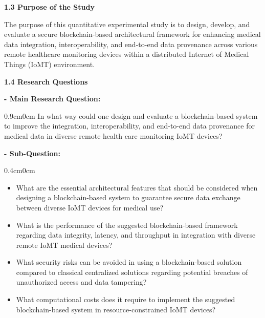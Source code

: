 \documentclass[12pt, a4paper]{report}
\begin{document}
\vspace{0.5cm}
{\color{myblue} \Large \bfseries 1.3 Purpose of the Study}

\noindent The purpose of this quantitative experimental study is to design, develop, and evaluate a secure blockchain-based architectural framework for enhancing medical data integration, interoperability, and end-to-end data provenance across various remote healthcare monitoring devices within a distributed Internet of Medical Things (IoMT) environment.


\vspace{0.5cm}
{\color{myblue} \Large \bfseries 1.4 Research Questions}

{\color{myblue} \bfseries - Main Research Question:} \\ \begin{adjustwidth}{0.9cm}{0cm}
\vspace{-2.0em}
In what way could one design and evaluate a blockchain-based system to improve the integration, interoperability, and end-to-end data provenance for medical data in diverse remote health care monitoring IoMT devices?
\end{adjustwidth}

{\color{myblue} \bfseries - Sub-Question:}
\vspace{-1.0em}
\begin{adjustwidth}{0.4cm}{0cm}
 \begin{itemize}[nosep, topsep=0pt, partopsep=0pt]
    \item What are the essential architectural features that should be considered when designing a blockchain-based system to guarantee secure data exchange between diverse IoMT devices for medical use?
    \item What is the performance of the suggested blockchain-based framework regarding data integrity, latency, and throughput in integration with diverse remote IoMT medical devices?
    \item What security risks can be avoided in using a blockchain-based solution compared to classical centralized solutions regarding potential breaches of unauthorized access and data tampering?
    \item What computational costs does it require to implement the suggested blockchain-based system in resource-constrained IoMT devices?
\end{itemize}   
\end{adjustwidth}
\end{document}
